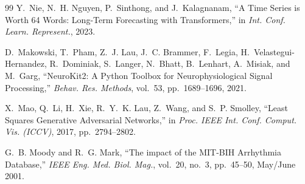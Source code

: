 \documentclass[11pt,a4paper]{article}
\begin{document}
\begin{thebibliography}{99}
Y.~Nie, N.~H. Nguyen, P.~Sinthong, and J.~Kalagnanam,
``A Time Series is Worth 64 Words: Long-Term Forecasting with Transformers,''
in \textit{Int. Conf. Learn. Represent.}, 2023.

D.~Makowski, T.~Pham, Z.~J. Lau, J.~C. Brammer, F.~Legia, H.~Velastegui-Hernandez, R.~Dominiak, S.~Langer, N.~Bhatt, B.~Lenhart, A.~Misiak, and M.~Garg,
``NeuroKit2: A Python Toolbox for Neurophysiological Signal Processing,''
\textit{Behav. Res. Methods}, vol.~53, pp.~1689--1696, 2021.

X.~Mao, Q.~Li, H.~Xie, R.~Y.~K. Lau, Z.~Wang, and S.~P. Smolley,
``Least Squares Generative Adversarial Networks,''
in \textit{Proc. IEEE Int. Conf. Comput. Vis. (ICCV)}, 2017, pp.~2794--2802.

G.~B. Moody and R.~G. Mark,
``The impact of the MIT-BIH Arrhythmia Database,''
\textit{IEEE Eng. Med. Biol. Mag.}, vol.~20, no.~3, pp.~45--50, May/June 2001.

\end{thebibliography}
\end{document}
